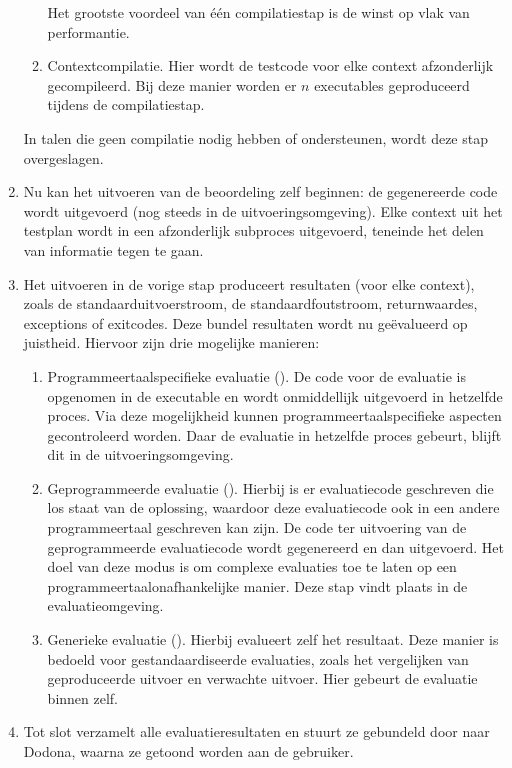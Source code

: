 \begin{enumerate}
\begin{enumerate}
        Het grootste voordeel van één compilatiestap is de winst op vlak van performantie.
        \item Contextcompilatie.
        Hier wordt de testcode voor elke context afzonderlijk gecompileerd.
        Bij deze manier worden er $n$ executables geproduceerd tijdens de compilatiestap.
    \end{enumerate}
    In talen die geen compilatie nodig hebben of ondersteunen, wordt deze stap overgeslagen.
    \item Nu kan het uitvoeren van de beoordeling zelf beginnen: de gegenereerde code wordt uitgevoerd (nog steeds in de uitvoeringsomgeving).
    Elke context uit het testplan wordt in een afzonderlijk subproces uitgevoerd, teneinde het delen van informatie tegen te gaan.
    \item Het uitvoeren in de vorige stap produceert resultaten (voor elke context), zoals de standaarduitvoerstroom, de standaardfoutstroom, returnwaardes, exceptions of exitcodes.
    Deze bundel resultaten wordt nu geëvalueerd op juistheid.
    Hiervoor zijn drie mogelijke manieren:
    \begin{enumerate}
        \item Programmeertaalspecifieke evaluatie ().
        De code voor de evaluatie is opgenomen in de executable en wordt onmiddellijk uitgevoerd in hetzelfde proces.
        Via deze mogelijkheid kunnen programmeertaalspecifieke aspecten gecontroleerd worden.
        Daar de evaluatie in hetzelfde proces gebeurt, blijft dit in de uitvoeringsomgeving.
        \item Geprogrammeerde evaluatie ().
        Hierbij is er evaluatiecode geschreven die los staat van de oplossing, waardoor deze evaluatiecode ook in een andere programmeertaal geschreven kan zijn.
        De code ter uitvoering van de geprogrammeerde evaluatiecode wordt gegenereerd en dan uitgevoerd.
        Het doel van deze modus is om complexe evaluaties toe te laten op een programmeertaalonafhankelijke manier.
        Deze stap vindt plaats in de evaluatieomgeving.
        \item Generieke evaluatie ().
        Hierbij evalueert \tested{} zelf het resultaat.
        Deze manier is bedoeld voor gestandaardiseerde evaluaties, zoals het vergelijken van geproduceerde uitvoer en verwachte uitvoer.
        Hier gebeurt de evaluatie binnen \tested{} zelf.
    \end{enumerate}
    \item Tot slot verzamelt \tested{} alle evaluatieresultaten en stuurt ze gebundeld door naar Dodona, waarna ze getoond worden aan de gebruiker.
\end{enumerate}


